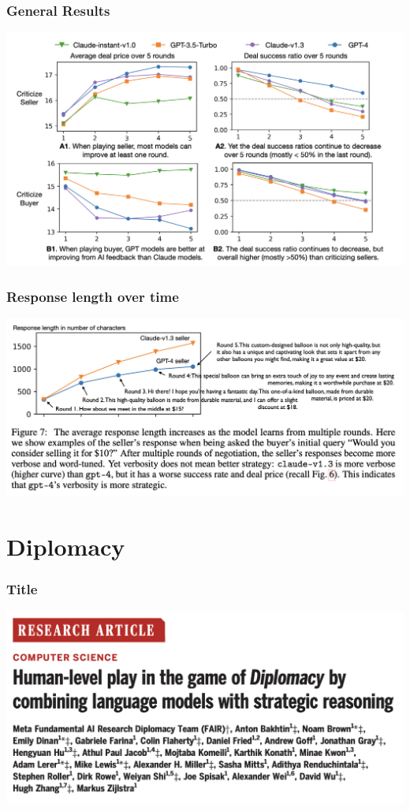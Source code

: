 \documentclass[xcolor=dvipsnames]{beamer}
\newcommand{\0}{\vec{0}}
\begin{document}
\begin{frame}
	\frametitle{General Results}
	\begin{center}
		\includegraphics[scale=0.3]{Fu4}
	\end{center}
\end{frame}
\begin{frame}
	\frametitle{Response length over time}
	\begin{center}
		\includegraphics[scale=0.3]{Fu5}
	\end{center}
\end{frame}

\section{Diplomacy}
\begin{frame}
	\frametitle{Title}
	\begin{center}
		\includegraphics[width=\textwidth]{Bakhtin0}
	\end{center}
\end{frame}
\end{document}

